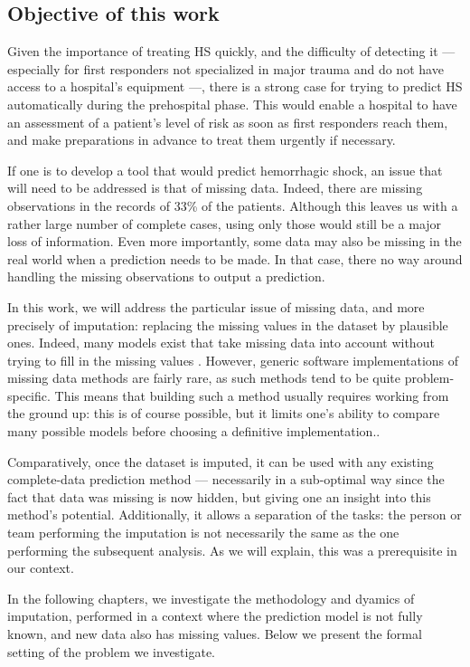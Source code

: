 		\subsection{Objective of this work}
Given the importance of treating HS quickly, and the difficulty of detecting it --- especially for first responders not specialized in major trauma and do not have access to a hospital's equipment ---, there is a strong case for trying to predict HS automatically during the prehospital phase. This would enable a hospital to have an assessment of a patient's level of risk as soon as first responders reach them, and make preparations in advance to treat them urgently if necessary.
		
If one is to develop a tool that would predict hemorrhagic shock, an issue that will need to be addressed is that of missing data. Indeed, there are missing observations in the records of 33\% of the patients. Although this leaves us with a rather large number of complete cases, using only those would still be a major loss of information. Even more importantly, some data may also be missing in the real world when a prediction needs to be made. In that case, there no way around handling the missing observations to output a prediction.

In this work, we will address the particular issue of missing data, and more precisely of imputation: replacing the missing values in the dataset by plausible ones. Indeed, many models exist that take missing data into account without trying to fill in the missing values \cite{schafer2002missing}. However, generic software implementations of missing data methods are fairly rare, as such methods tend to be quite problem-specific. This means that building such a method usually requires working from the ground up: this is of course possible, but it limits one's ability to compare many possible models before choosing a definitive implementation..

Comparatively, once the dataset is imputed, it can be used with any existing complete-data prediction method --- necessarily in a sub-optimal way since the fact that data was missing is now hidden, but giving one an insight into this method's potential. Additionally, it allows a separation of the tasks: the person or team performing the imputation is not necessarily the same as the one performing the subsequent analysis. As we will explain, this was a prerequisite in our context.

 In the following chapters, we investigate the methodology and dyamics of imputation, performed in a context where the prediction model is not fully known, and new data also has missing values. Below we present the formal setting of the problem we investigate.
 
